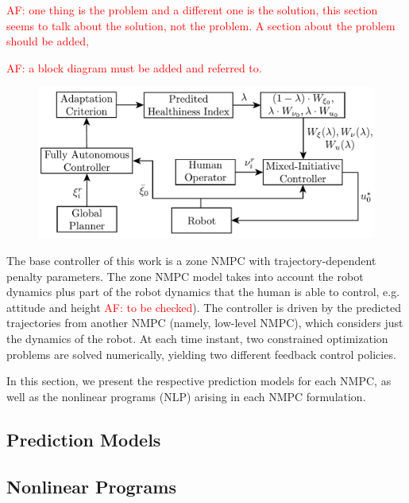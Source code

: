 \textcolor{red}{AF: one thing is the problem and a different one is the solution, this section seems to talk about the solution, not the problem. A section about the problem should be added,}

\textcolor{red}{AF: a block diagram must be added and referred to.}

\begin{figure}
	\centering
	\includegraphics[width=1.0\textwidth]{figure/block_diagram}
\end{figure}

The base controller of this work is a zone NMPC with trajectory-dependent penalty parameters. The zone NMPC model takes into account the robot dynamics plus part of the robot dynamics that the human is able to control, e.g. attitude and height \textcolor{red}{AF: to be checked}). The controller is driven by the predicted trajectories from another NMPC (namely, low-level NMPC), which considers just the dynamics of the robot. At each time instant, two constrained optimization problems are solved numerically, yielding two different feedback control policies.

In this section, we present the respective prediction models for each NMPC, as well as the nonlinear programs (NLP) arising in each NMPC formulation. 
\subsection{Prediction Models}

\subsection{Nonlinear Programs}

